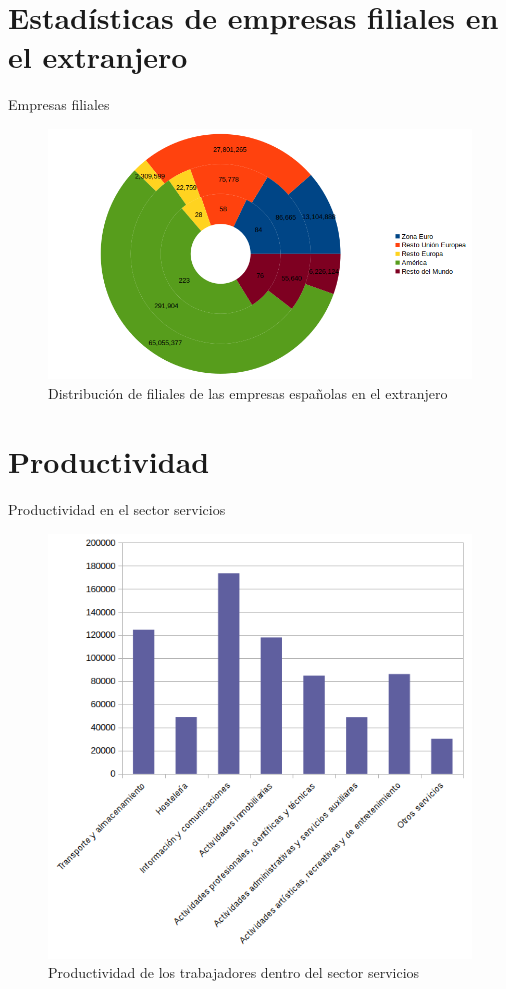 \documentclass{beamer}
\begin{document}
\section{Estadísticas de empresas filiales en el extranjero}

\begin{frame}{Empresas filiales}
  \begin{figure}[H]
    \centering
    \includegraphics[width=\textwidth]{../graficos/sectores_filiales}
    \caption{Distribución de filiales de las empresas españolas en el
      extranjero}
  \end{figure}
\end{frame}

\section{Productividad}

\begin{frame}{Productividad en el sector servicios}
\begin{figure}[H]
  \centering
  \includegraphics[width=.6\textwidth]{../graficos/barras_productividad_servicios}
  \caption{Productividad de los trabajadores dentro del sector
    servicios}
\end{figure}
\end{frame}
\end{document}
